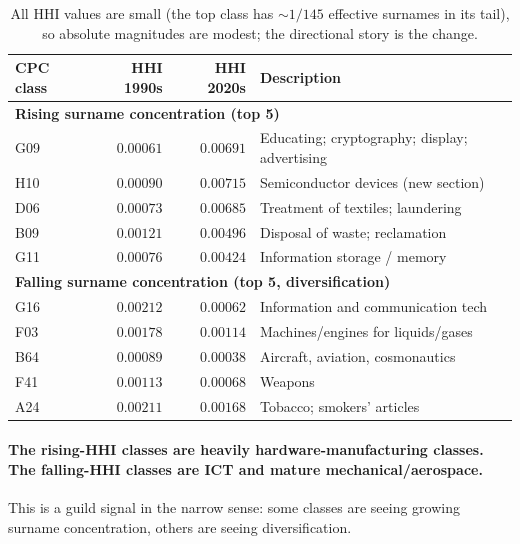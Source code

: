 \documentclass[11pt]{article}
\begin{document}
\begin{table}[h]
\centering
\small
\begin{tabular}{lrrl}
\toprule
CPC class & HHI 1990s & HHI 2020s & Description \\
\midrule
\multicolumn{4}{l}{\textbf{Rising surname concentration (top 5)}} \\
G09 & $0.00061$ & $0.00691$ & Educating; cryptography; display; advertising \\
H10 & $0.00090$ & $0.00715$ & Semiconductor devices (new section) \\
D06 & $0.00073$ & $0.00685$ & Treatment of textiles; laundering \\
B09 & $0.00121$ & $0.00496$ & Disposal of waste; reclamation \\
G11 & $0.00076$ & $0.00424$ & Information storage / memory \\
\midrule
\multicolumn{4}{l}{\textbf{Falling surname concentration (top 5, diversification)}} \\
G16 & $0.00212$ & $0.00062$ & Information and communication tech \\
F03 & $0.00178$ & $0.00114$ & Machines/engines for liquids/gases \\
B64 & $0.00089$ & $0.00038$ & Aircraft, aviation, cosmonautics \\
F41 & $0.00113$ & $0.00068$ & Weapons \\
A24 & $0.00211$ & $0.00168$ & Tobacco; smokers' articles \\
\bottomrule
\end{tabular}
\caption{All HHI values are small (the top class has $\sim 1/145$
effective surnames in its tail), so absolute magnitudes are modest;
the directional story is the change.}
\end{table}

\paragraph{The rising-HHI classes are heavily hardware-manufacturing
classes. The falling-HHI classes are ICT and mature
mechanical/aerospace.} This is a guild signal in the narrow sense:
some classes are seeing growing surname concentration, others are
seeing diversification.
\end{document}
